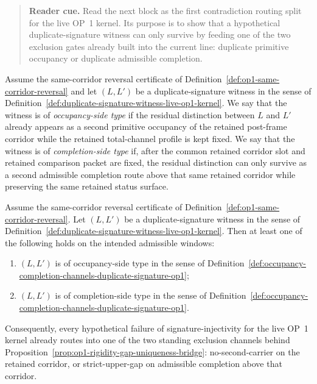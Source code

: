 \begin{quote}\small
\noindent\textbf{Reader cue.} Read the next block as the first contradiction routing split for the live OP~1 kernel. Its purpose is to show that a hypothetical duplicate-signature witness can only survive by feeding one of the two exclusion gates already built into the current line: duplicate primitive occupancy or duplicate admissible completion.
\end{quote}

\begin{definition}
\label{def:occupancy-completion-channels-duplicate-signature-op1}
Assume the same-corridor reversal certificate of Definition~\ref{def:op1-same-corridor-reversal} and let $(L,L')$ be a duplicate-signature witness in the sense of Definition~\ref{def:duplicate-signature-witness-live-op1-kernel}. We say that the witness is of \emph{occupancy-side type} if the residual distinction between $L$ and $L'$ already appears as a second primitive occupancy of the retained post-frame corridor while the retained total-channel profile is kept fixed. We say that the witness is of \emph{completion-side type} if, after the common retained corridor slot and retained comparison packet are fixed, the residual distinction can only survive as a second admissible completion route above that same retained corridor while preserving the same retained status surface.
\end{definition}

\begin{proposition}
\label{prop:duplicate-signature-witness-feeds-standing-op1-exclusion-gate}
Assume the same-corridor reversal certificate of Definition~\ref{def:op1-same-corridor-reversal}. Let $(L,L')$ be a duplicate-signature witness in the sense of Definition~\ref{def:duplicate-signature-witness-live-op1-kernel}. Then at least one of the following holds on the intended admissible windows:
\begin{enumerate}[label=(\roman*)]
 \item $(L,L')$ is of occupancy-side type in the sense of Definition~\ref{def:occupancy-completion-channels-duplicate-signature-op1};
 \item $(L,L')$ is of completion-side type in the sense of Definition~\ref{def:occupancy-completion-channels-duplicate-signature-op1}.
\end{enumerate}
Consequently, every hypothetical failure of signature-injectivity for the live OP~1 kernel already routes into one of the two standing exclusion channels behind Proposition~\ref{prop:op1-rigidity-gap-uniqueness-bridge}: no-second-carrier on the retained corridor, or strict-upper-gap on admissible completion above that corridor.
\end{proposition}

